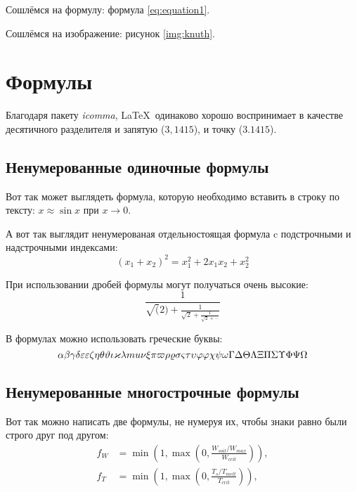 Сошлёмся на формулу: формула \eqref{eq:equation1}.

Сошлёмся на изображение: рисунок \ref{img:knuth}.


\section{Формулы} \label{sect1_3}

Благодаря пакету \textit{icomma}, \LaTeX~одинаково хорошо воспринимает в качестве десятичного разделителя и запятую ($3,1415$), и точку ($3.1415$).

\subsection{Ненумерованные одиночные формулы} \label{subsect1_3_1}

Вот так может выглядеть формула, которую необходимо вставить в строку по тексту: $x \approx \sin x$ при $x \to 0$.

А вот так выглядит ненумерованая отдельностоящая формула c подстрочными и надстрочными индексами:
\[
(x_1+x_2)^2 = x_1^2 + 2 x_1 x_2 + x_2^2
\]

При использовании дробей формулы могут получаться очень высокие:
\[
  \frac{1}{\sqrt(2)+
  \displaystyle\frac{1}{\sqrt{2}+
  \displaystyle\frac{1}{\sqrt{2}+\cdots}}}
\]

В формулах можно использовать греческие буквы:
\[
\alpha\beta\gamma\delta\epsilon\varepsilon\zeta\eta\theta\vartheta\iota\kappa\lambda\\mu\nu\xi\pi\varpi\rho\varrho\sigma\varsigma\tau\upsilon\phi\varphi\chi\psi\omega\Gamma\Delta\Theta\Lambda\Xi\Pi\Sigma\Upsilon\Phi\Psi\Omega
\]


\subsection{Ненумерованные многострочные формулы} \label{subsect1_3_2}

Вот так можно написать две формулы, не нумеруя их, чтобы знаки равно были строго друг под другом:
\begin{align}
  f_W & =  \min \left( 1, \max \left( 0, \frac{W_{soil} / W_{max}}{W_{crit}} \right)  \right), \nonumber \\
  f_T & =  \min \left( 1, \max \left( 0, \frac{T_s / T_{melt}}{T_{crit}} \right)  \right), \nonumber
\end{align}


